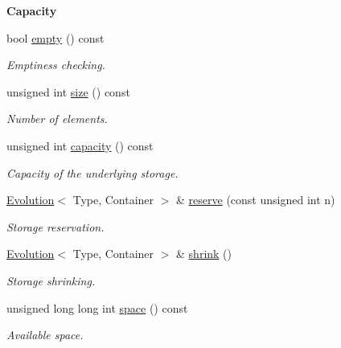 \begin{Indent}{\bf Capacity}\par
\begin{DoxyCompactItemize}
\item 
bool \hyperlink{exceptionmagrathea_1_1Evolution_a8cd0c937688d5b6970c71c971327b191}{empty} () const 
\begin{DoxyCompactList}\small\item\em Emptiness checking. \end{DoxyCompactList}\item 
unsigned int \hyperlink{exceptionmagrathea_1_1Evolution_a78e80655301aac59843bc93e24edd3ad}{size} () const 
\begin{DoxyCompactList}\small\item\em Number of elements. \end{DoxyCompactList}\item 
unsigned int \hyperlink{exceptionmagrathea_1_1Evolution_a6d0d5f5d4d9637c1319a549bb721694d}{capacity} () const 
\begin{DoxyCompactList}\small\item\em Capacity of the underlying storage. \end{DoxyCompactList}\item 
\hyperlink{exceptionmagrathea_1_1Evolution}{Evolution}$<$ Type, Container $>$ \& \hyperlink{exceptionmagrathea_1_1Evolution_a644d377b0a423d1dd8940fd032da7268}{reserve} (const unsigned int n)
\begin{DoxyCompactList}\small\item\em Storage reservation. \end{DoxyCompactList}\item 
\hyperlink{exceptionmagrathea_1_1Evolution}{Evolution}$<$ Type, Container $>$ \& \hyperlink{exceptionmagrathea_1_1Evolution_a50fb995fd759899251abf02c085a5d1a}{shrink} ()
\begin{DoxyCompactList}\small\item\em Storage shrinking. \end{DoxyCompactList}\item 
unsigned long long int \hyperlink{exceptionmagrathea_1_1Evolution_ae5a39bd51ec819971dd23c4aca6a75d5}{space} () const 
\begin{DoxyCompactList}\small\item\em Available space. \end{DoxyCompactList}\end{DoxyCompactItemize}
\end{Indent}
